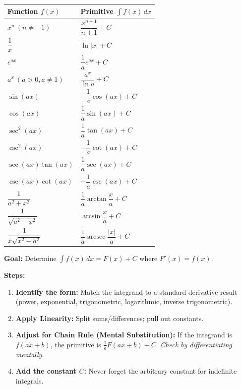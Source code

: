 \documentclass[11pt]{article}
\begin{document}
\begin{aretenir}
\begin{center}
\begin{tabularx}{\linewidth}{|l|X|}\hline
\textbf{Function $f(x)$} & \textbf{Primitive $\int f(x)\,dx$} \\ \hline
$x^n\ (n\neq -1)$ & $\dfrac{x^{n+1}}{n+1}+C$ \\ \hline
$\dfrac{1}{x}$ & $\ln|x|+C$ \\ \hline
$e^{ax}$ & $\dfrac{1}{a}e^{ax}+C$ \\ \hline
$a^x\ (a>0,a\neq1)$ & $\dfrac{a^x}{\ln a}+C$ \\ \hline
$\sin(ax)$ & $-\dfrac{1}{a}\cos(ax)+C$ \\ \hline
$\cos(ax)$ & $\dfrac{1}{a}\sin(ax)+C$ \\ \hline
$\sec^2(ax)$ & $\dfrac{1}{a}\tan(ax)+C$ \\ \hline
$\csc^2(ax)$ & $-\dfrac{1}{a}\cot(ax)+C$ \\ \hline
$\sec(ax)\tan(ax)$ & $\dfrac{1}{a}\sec(ax)+C$ \\ \hline
$\csc(ax)\cot(ax)$ & $-\dfrac{1}{a}\csc(ax)+C$ \\ \hline
$\dfrac{1}{a^2+x^2}$ & $\dfrac{1}{a}\arctan\dfrac{x}{a}+C$ \\ \hline
$\dfrac{1}{\sqrt{a^2-x^2}}$ & $\arcsin\dfrac{x}{a}+C$ \\ \hline
$\dfrac{1}{x\sqrt{x^2-a^2}}$ & $\dfrac{1}{a}\operatorname{arcsec}\dfrac{|x|}{a}+C$ \\ \hline
\end{tabularx}
\end{center}
\end{aretenir}

\begin{methode}
\textbf{Goal:} Determine $\int f(x)\,dx = F(x)+C$ where $F'(x)=f(x)$.
\par\noindent\textbf{Steps:}
\begin{enumerate}
    \item \textbf{Identify the form:} Match the integrand to a standard derivative result (power, exponential, trigonometric, logarithmic, inverse trigonometric).
    \item \textbf{Apply Linearity:} Split sums/differences; pull out constants.
    \item \textbf{Adjust for Chain Rule (Mental Substitution):} If the integrand is $f(ax+b)$, the primitive is $\frac{1}{a}F(ax+b)+C$. \emph{Check by differentiating mentally.}
    \item \textbf{Add the constant $C$:} Never forget the arbitrary constant for indefinite integrals.
\end{enumerate}
\end{methode}
\end{document}
